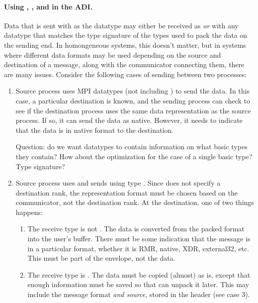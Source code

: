 \documentclass{article}
\begin{document}
\paragraph{Using , ,
   and  in the ADI.}
Data that is sent with  as the datatype may either be
received as  \emph{or} with any datatype that matches the
type signature of the types used to pack the data on the sending end.  In
homongeneous systems, this doesn't matter, but in systems where different data
formats may be used depending on the source and destination of a message,
along with the communicator connecting them, there are many issues.
Consider the following cases of sending between two processes:
\begin{enumerate}
\item Source process uses MPI datatypes (not including )
  to send the data.  In this case, a particular destination is known, and the
  sending process can check to see if the destination process uses the same
  data representation as the source process.  If so, it can send the data as
  native.  However, it needs to indicate that the data is in native format to
  the destination.

  Question: do we want datatypes to contain information on what basic types
  they contain?  How about the optimization for the case of a single basic
  type?  Type signature?

\item Source process uses  and sends using type
  .  Since  does not specify a
  destination rank, the representation format must be chosen based on the
  communicator, not the destination rank.  At the destination, one of two
  things happens:
  \begin{enumerate}
  \item The receive type is not .  The data is converted
    from the packed format into the user's buffer.  There must be some
    indication that the message is in a particular format, whether it is
    RMR, native, XDR, external32, etc.  This must be part of the
    envelope, not the data.

  \item The receive type is .  The data must be copied
    (almost) as is, except that enough information must be saved so that
     can unpack it later.  This may include the message
    format \emph{and source}, stored in the header (see case 3).


\end{enumerate}
\end{enumerate}
\end{document}

